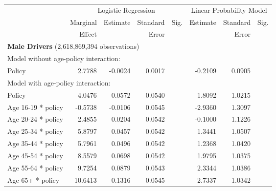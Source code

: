 
\begin{table}%
\centering 
\begin{tabular}{l r r r l r r l} 

\hline 
 
 & \multicolumn{4}{c}{Logistic Regression}  & \multicolumn{3}{c}{Linear Probability Model} \\ 

 \cmidrule(lr){2-5}\cmidrule(lr){6-8} 
 & Marginal & Estimate & Standard & Sig. & Estimate & Standard & Sig. \\ 
 &   Effect &          &  Error   &      &          &  Error   &     \\ 

\hline 
 
\multicolumn{7}{l}{\textbf{Male Drivers} (2,618,869,394 observations)} \\ 

\hline
\multicolumn{7}{l}{Model without age-policy interaction: } \\ 
Policy                   &  2.7788       &  -0.0024        &  0.0017       &            &  -0.2109        &  0.0905       &            \\ 
\hline
\multicolumn{7}{l}{Model with age-policy interaction: } \\ 
Policy                   &  -4.0476       &  -0.0572        &  0.0540       &            &  -1.8092        &  1.0215       &            \\ 
Age 16-19 * policy   &  -0.5738       &  -0.0106        &  0.0545       &            &  -2.9360        &  1.3097       &            \\ 
Age 20-24 * policy   &  2.4855       &  0.0204        &  0.0542       &            &  -0.1000        &  1.1226       &            \\ 
Age 25-34 * policy   &  5.8797       &  0.0457        &  0.0542       &            &  1.3441        &  1.0507       &            \\ 
Age 35-44 * policy   &  5.7961       &  0.0496        &  0.0542       &            &  1.2368        &  1.0420       &            \\ 
Age 45-54 * policy   &  8.5579       &  0.0698        &  0.0542       &            &  1.9795        &  1.0375       &            \\ 
Age 55-64 * policy   &  9.7254       &  0.0879        &  0.0543       &            &  2.3344        &  1.0386       &            \\ 
Age 65+ * policy   &  10.6413       &  0.1316        &  0.0545       &            &  2.7337        &  1.0342       &            \\ 


\end{tabular}
\end{table}
